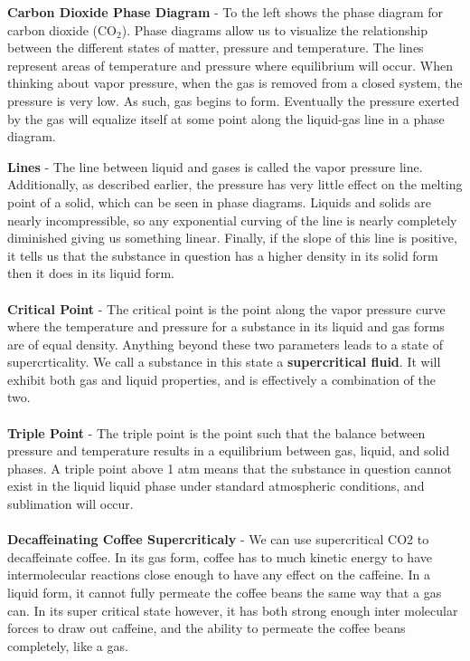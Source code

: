 \documentclass{article}
\begin{document}
\begin{minipage}{0.67\textwidth}
	\textbf{Carbon Dioxide Phase Diagram} - To the left shows the phase diagram for carbon dioxide (CO$_2$). Phase diagrams allow us to visualize the relationship between the different states of matter, pressure and temperature. The lines represent areas of temperature and pressure where equilibrium will occur. When thinking about vapor pressure, when the gas is removed from a closed system, the pressure is very low. As such, gas begins to form. Eventually the pressure exerted by the gas will equalize itself at some point along the liquid-gas line in a phase diagram.  \\

\end{minipage}

\vspace{10pt}

\noindent\textbf{Lines} - The line between liquid and gases is called the vapor pressure line. Additionally, as described earlier, the pressure has very little effect on the melting point of a solid, which can be seen in phase diagrams. Liquids and solids are nearly incompressible, so any exponential curving of the line is nearly completely diminished giving us something linear. Finally, if the slope of this line is positive, it tells us that the substance in question has a higher density in its solid form then it does in its liquid form.\\
\\
\textbf{Critical Point} - The critical point is the point along the vapor pressure curve where the temperature and pressure for a substance in its liquid and gas forms are of equal density. Anything beyond these two parameters leads to a state of supercrticality. We call a substance in this state a \textbf{supercritical fluid}. It will exhibit both gas and liquid properties, and is effectively a combination of the two.\\
\\
\textbf{Triple Point} - The triple point is the point such that the balance between pressure and temperature results in a equilibrium between gas, liquid, and solid phases. A triple point above 1 atm means that the substance in question cannot exist  in the liquid liquid phase under standard atmospheric conditions, and sublimation will occur. \\
\\
\textbf{Decaffeinating Coffee Supercriticaly} - We can use supercritical CO2 to decaffeinate coffee. In its gas form, coffee has to much kinetic energy to have intermolecular reactions close enough to have any effect on the caffeine. In a liquid form, it cannot fully permeate the coffee beans the same way that a gas can. In its super critical state however, it has both strong enough inter molecular forces to draw out caffeine, and the ability to permeate the coffee beans completely, like a gas.
\end{document}
